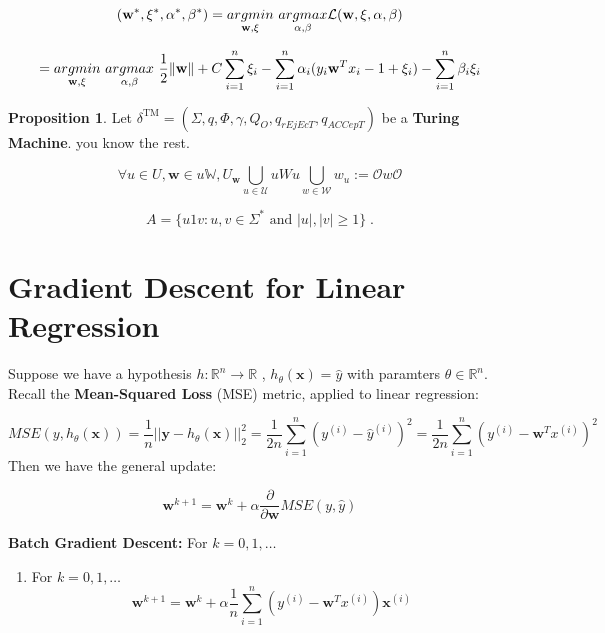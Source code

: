 \documentclass[12pt a]{article}
\theoremstyle{definition}
\theoremstyle{definition}
\newtheorem{proposition}[theorem]{Proposition}
\theoremstyle{definition}
\begin{document}
{$$(\mathbf{w}^{*},\mathbf{\xi}^{*}, \alpha^{*}, \beta^{*}) = \underset{\mathbf{w}, \xi}{argmin} \text{\space} \underset{\alpha, \beta}{argmax} \mathcal{L}(\mathbf{w}, \mathbf{\xi}, \alpha , \beta)$$

$$=\underset{\mathbf{w}, \xi}{argmin} \text{\space} \underset{\alpha, \beta}{argmax} \text{\space} 
\frac{1}{2}\|\mathbf{w}\|  + 
C\sum_{i=1}^{n}\xi_{i} - 
\sum_{i=1}^{n}\alpha_{i}(y_{i}\mathbf{w}^{T}x_{i} - 1 + \xi_{i}) - 
\sum_{i=1}^{n}\beta_i \xi_i
$$


\begin{proposition}
Let $\delta^{\text{TM}}=(\Sigma, q, \Phi, \gamma, Q_O, q_{rEjEcT}, q_{ACCepT} )$ be a \textbf{Turing Machine}. you know the rest. 
\end{proposition}


$$\forall u \in U,\mathbf{w} \in u\mathbb{W} , U_{\mathbf{w}} \bigcup_{u \in \mathcal{U}} uWu \bigcup_{w \in \mathcal{W}}w_{u} := \mathcal{O} w \mathcal{O}$$


$$A=\{u1v:u,v\in\Sigma^*\text{ and }|u|,|v|\ge 1\}\;.$$

\newpage

\section{Gradient Descent for Linear Regression}

Suppose we have a hypothesis $h: \mathbb{R}^{n} \rightarrow  \mathbb{R}$ , $h_{\theta}(\textbf{x})=\hat{y}$ with paramters $\theta \in \mathbb{R}^{n}$. Recall the \textbf{Mean-Squared Loss} (MSE) metric, applied to linear regression:  

$$MSE(y,h_{\theta}(\textbf{x}))
=
\frac{1}{n}||\mathbf{y} - h_{\theta}(\textbf{x}) ||^{2}_2
=
\frac{1}{2n}\sum_{i=1}^{n}(y^{(i)}-\hat{y}^{(i)})^{2} 
= 
\frac{1}{2n}\sum_{i=1}^{n}(y^{(i)}-\mathbf{w}^{T}x^{(i)})^{2}$$
Then we have the general update: 

$$\mathbf{w}^{k+1}=\mathbf{w}^{k}+ \alpha \frac{\partial}{\partial \mathbf{w} }MSE(y,\hat{y}) $$

\textbf{Batch Gradient Descent:} For $k=0,1,\dots$

\begin{enumerate}
	\item For $k=0,1,\dots$
	$$\mathbf{w}^{k+1}=\mathbf{w}^{k}+ \alpha 
\frac{1}{n}\sum_{i=1}^{n}(y^{(i)}-\mathbf{w}^{T}x^{(i)})\mathbf{x}^{(i)} $$
\end{enumerate}



}
\end{document}
